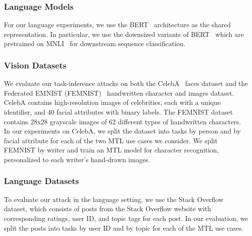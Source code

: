 \subsubsection{Language Models} For our language experiments, we use the BERT~\cite{devlin2018bert}  architecture as the shared representation. In particular, we use the downsized variants of BERT~\cite{bertsmall_1, bertsmall_2} which are pretrained on MNLI~\cite{MNLI} for downstream sequence classification.



\subsubsection{Vision Datasets} We evaluate our task-inference attacks on both the CelebA~\cite{liu-2015-celeba} faces dataset and the Federated EMNIST (FEMNIST)~\cite{caldas-2019-leafbenchmark} handwritten character and images dataset. CelebA contains high-resolution images of celebrities, each with a unique identifier, and 40 facial attributes with binary labels. The FEMNIST dataset contains 28x28 grayscale images of 62 different types of handwritten characters. In our experiments on CelebA, we split the dataset into tasks by person and by facial attribute for each of the two MTL use cases we consider. We split FEMNIST by writer and train an MTL model for character recognition, personalized to each writer's hand-drawn images.



\subsubsection{Language Datasets} To evaluate our attack in the language setting, we use the Stack Overflow~\cite{stackoverflow} dataset, which consists of posts from the Stack Overflow website with corresponding ratings, user ID, and topic tags for each post. In our evaluation, we split the posts into tasks by user ID and by topic for each of the MTL use cases. 

